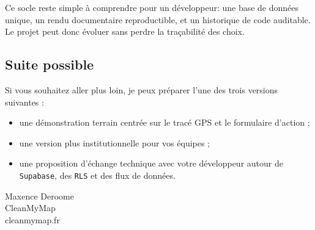\documentclass[
  french,
  10pt,
  a4paper,
  oneside]{article}
\providecommand{\tightlist}{%
\setlength{\itemsep}{0pt}\setlength{\parskip}{0pt}}
\begin{document}
Ce socle reste simple à comprendre pour un développeur: une base de
données unique, un rendu documentaire reproductible, et un historique de
code auditable. Le projet peut donc évoluer sans perdre la traçabilité
des choix.

\subsection{Suite possible}\label{suite-possible}

Si vous souhaitez aller plus loin, je peux préparer l'une des trois
versions suivantes :

\begin{itemize}
\tightlist
\item
  une démonstration terrain centrée sur le tracé GPS et le formulaire
  d'action ;
\item
  une version plus institutionnelle pour vos équipes ;
\item
  une proposition d'échange technique avec votre développeur autour de
  \texttt{Supabase}, des \texttt{RLS} et des flux de données.
\end{itemize}

Maxence Deroome\\
CleanMyMap\\
cleanmymap.fr
\end{document}
